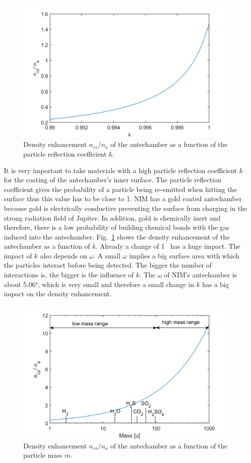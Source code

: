 	\begin{figure}[h] %
		\centering
		\includegraphics[width= .7\textwidth]{Bilder/k.png}
		\caption{Density enhancement $n_{cs}/n_a$ of the antechamber as a function of the particle reflection coefficient $k$.}
		\label{th:densEnhk}
	\end{figure}
	It is very important to take materials with a high particle reflection coefficient $k$ for the coating of the antechamber's inner surface. The particle reflection coefficient gives the probability of a particle being re-emitted when hitting the surface thus this value has to be close to 1. NIM has a gold coated antechamber because gold is electrically conductive preventing the surface from charging in the strong radiation field of Jupiter. In addition, gold is chemically inert and therefore, there is a low probability of building chemical bonds with the gas induced into the antechamber. Fig.~\ref{th:densEnhk} shows the density enhancement of the antechamber as a function of $k$. Already a change of 1\textperthousand~ has a huge impact. The impact of $k$ also depends on $\omega$. A small $\omega$ implies a big surface area with which the particles interact before being detected. The bigger the number of interactions is, the bigger is the influence of $k$. The $\omega$ of NIM's antechamber is about 5.06°, which is very small and therefore a small change in $k$ has a big impact on the density enhancement.\\
	\begin{figure}[h!] %
		\centering
		\includegraphics[width= .7\textwidth]{Bilder/mV1.png}
		\caption{Density enhancement $n_{cs}/n_a$ of the antechamber as a function of the particle mass $m$.}
		\label{th:densEnhm}
	\end{figure}
